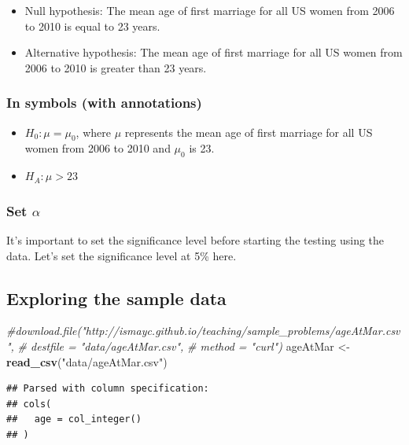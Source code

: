 \documentclass[]{tufte-book}
\newenvironment{Shaded}{\begin{snugshade}}{\end{snugshade}}
\newcommand{\KeywordTok}[1]{\textcolor[rgb]{0.13,0.29,0.53}{\textbf{{#1}}}}
\newcommand{\StringTok}[1]{\textcolor[rgb]{0.31,0.60,0.02}{{#1}}}
\newcommand{\CommentTok}[1]{\textcolor[rgb]{0.56,0.35,0.01}{\textit{{#1}}}}
\newcommand{\NormalTok}[1]{{#1}}
\providecommand{\tightlist}{%
  \setlength{\itemsep}{0pt}\setlength{\parskip}{0pt}}
\begin{document}
\begin{itemize}
\item
  Null hypothesis: The mean age of first marriage for all US women from
  2006 to 2010 is equal to 23 years.
\item
  Alternative hypothesis: The mean age of first marriage for all US
  women from 2006 to 2010 is greater than 23 years.
\end{itemize}

\subsubsection{In symbols (with
annotations)}\label{in-symbols-with-annotations}

\begin{itemize}
\tightlist
\item
  \(H_0: \mu = \mu_{0}\), where \(\mu\) represents the mean age of first
  marriage for all US women from 2006 to 2010 and \(\mu_0\) is 23.
\item
  \(H_A: \mu > 23\)
\end{itemize}

\subsubsection{\texorpdfstring{Set
\(\alpha\)}{Set \textbackslash{}alpha}}\label{set-alpha}

It's important to set the significance level before starting the testing
using the data. Let's set the significance level at 5\% here.

\subsection{Exploring the sample data}\label{exploring-the-sample-data}

\begin{Shaded}
\begin{Highlighting}[]
\CommentTok{#download.file("http://ismayc.github.io/teaching/sample_problems/ageAtMar.csv", }
\CommentTok{#  destfile = "data/ageAtMar.csv",}
\CommentTok{#  method = "curl")}
\NormalTok{ageAtMar <-}\StringTok{ }\KeywordTok{read_csv}\NormalTok{(}\StringTok{"data/ageAtMar.csv"}\NormalTok{)}
\end{Highlighting}
\end{Shaded}

\begin{verbatim}
## Parsed with column specification:
## cols(
##   age = col_integer()
## )
\end{verbatim}
\end{document}
